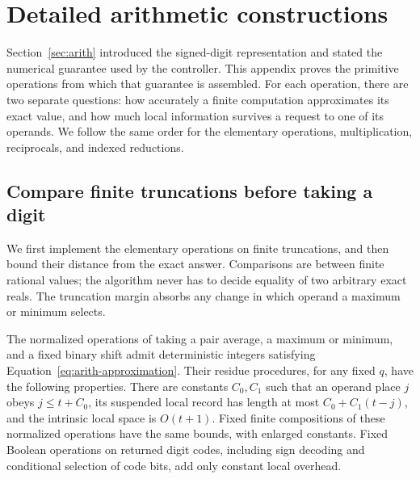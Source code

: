 \section{Detailed arithmetic constructions}

Section~\ref{sec:arith} introduced the signed-digit representation and stated the numerical guarantee used by the controller. This appendix proves the primitive operations from which that guarantee is assembled. For each operation, there are two separate questions: how accurately a finite computation approximates its exact value, and how much local information survives a request to one of its operands. We follow the same order for the elementary operations, multiplication, reciprocals, and indexed reductions.

\subsection{Compare finite truncations before taking a digit}

We first implement the elementary operations on finite truncations, and then bound their distance from the exact answer. Comparisons are between finite rational values; the algorithm never has to decide equality of two arbitrary exact reals. The truncation margin absorbs any change in which operand a maximum or minimum selects.


\begin{lemma}
\label{lem:arith-elementary}
The normalized operations of taking a pair average, a maximum or
minimum, and a fixed binary shift admit deterministic integers
satisfying Equation~\eqref{eq:arith-approximation}.  Their residue
procedures, for any fixed $q$, have the following properties.  There
are constants $C_0,C_1$ such that an operand place $j$ obeys
$j\leq t+C_0$, its suspended local record has length at most
$C_0+C_1(t-j)$, and the intrinsic local space is $O(t+1)$.
Fixed finite compositions of these normalized operations have the
same bounds, with enlarged constants.  Fixed Boolean operations on
returned digit codes, including sign decoding and conditional selection
of code bits, add only constant local overhead.
\end{lemma}


